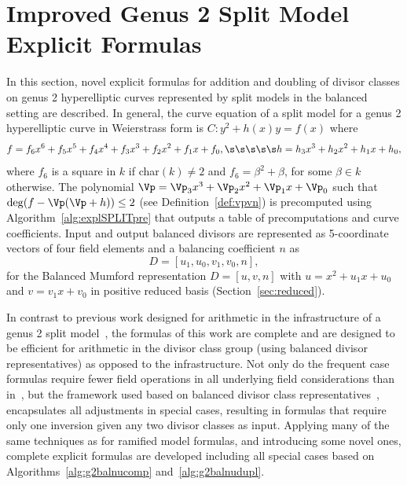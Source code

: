 \section{Improved Genus 2 Split Model Explicit Formulas}
\label{sec:g2splitExpl}

In this section, novel explicit formulas for addition and doubling of divisor
classes on genus 2 hyperelliptic curves represented by split models in the
balanced setting are described. In general, the curve equation of a split model
for a genus 2 hyperelliptic curve in Weierstrass form is $C: y^2 + h(x)y = f(x)$
where
$$f = f_6x^6 + f_5x^5 + f_4x^4 + f_3x^3 + f_2 x^2 + f_1x + f_0, \s\s\s\s\s h =
h_3x^3 + h_2x^2 + h_1x + h_0,$$ where $f_6$ is a square in $k$ if char$(k) \neq
2$ and $f_6 = \beta^2 + \beta$, for some $\beta \in k$ otherwise. The polynomial
$\Vp = \Vp_3x^3 + \Vp_2x^2 + \Vp_1x + \Vp_0$ such that $\deg(f - \Vp(\Vp + h))
\leq 2$ (see Definition~\ref{def:vpvn}) is precomputed using
Algorithm~\ref{alg:explSPLITpre} that outputs a table of precomputations and
curve coefficients. Input and output balanced divisors are represented as
5-coordinate vectors of four field elements and a balancing coefficient $n$ as$$
D = [u_1,u_0,v_1,v_0,n],$$ for the Balanced Mumford representation $D = [u,v,n]$
with $u = x^2 + u_1x + u_0$ and $v = v_1x + v_0$ in positive reduced basis
(Section~\ref{sec:reduced}).  

In contrast to previous work designed for arithmetic in the infrastructure of a
genus 2 split model~\cite{EricksonJacobsonStein_realg2_2011}, the formulas of
this work are complete and are designed to be efficient for arithmetic in the
divisor class group (using balanced divisor representatives) as opposed to the
infrastructure. Not only do the frequent case formulas require fewer field
operations in all underlying field considerations than
in~\cite{EricksonJacobsonStein_realg2_2011}, but the framework used based on
balanced divisor class representatives~\cite{Galbraith_balanced_2008},
encapsulates all adjustments in special cases, resulting in formulas that
require only one inversion given any two divisor classes as input. Applying many
of the same techniques as for ramified model formulas, and introducing some
novel ones, complete explicit formulas are developed including all special cases
based on Algorithms~\ref{alg:g2balnucomp} and~\ref{alg:g2balnudupl}.

